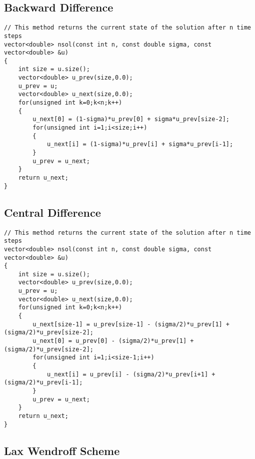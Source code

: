 \documentclass[11pt]{article}
\begin{document}
\subsection{Backward Difference}
\label{sec:org0d0187f}
\begin{verbatim}
// This method returns the current state of the solution after n time steps
vector<double> nsol(const int n, const double sigma, const vector<double> &u)
{
    int size = u.size();
    vector<double> u_prev(size,0.0);
    u_prev = u;
    vector<double> u_next(size,0.0);
    for(unsigned int k=0;k<n;k++)
    {
        u_next[0] = (1-sigma)*u_prev[0] + sigma*u_prev[size-2];
        for(unsigned int i=1;i<size;i++)
        {
            u_next[i] = (1-sigma)*u_prev[i] + sigma*u_prev[i-1];
        }
        u_prev = u_next;
    }
    return u_next;
}
\end{verbatim}
\subsection{Central Difference}
\label{sec:org4e41b8d}
\begin{verbatim}
// This method returns the current state of the solution after n time steps
vector<double> nsol(const int n, const double sigma, const vector<double> &u)
{
    int size = u.size();
    vector<double> u_prev(size,0.0);
    u_prev = u;
    vector<double> u_next(size,0.0);
    for(unsigned int k=0;k<n;k++)
    {
        u_next[size-1] = u_prev[size-1] - (sigma/2)*u_prev[1] + (sigma/2)*u_prev[size-2];
        u_next[0] = u_prev[0] - (sigma/2)*u_prev[1] + (sigma/2)*u_prev[size-2];
        for(unsigned int i=1;i<size-1;i++)
        {
            u_next[i] = u_prev[i] - (sigma/2)*u_prev[i+1] + (sigma/2)*u_prev[i-1];
        }
        u_prev = u_next;
    }
    return u_next;
}
\end{verbatim}
\subsection{Lax Wendroff Scheme}
\label{sec:org27f6a2f}
\end{document}
